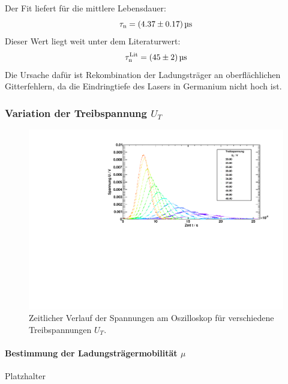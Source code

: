 Der Fit liefert für die mittlere Lebensdauer:
\begin{equation}
  \tau_\text{n} = (4.37 \pm 0.17)\,\text{\textmu s}
\end{equation}
Dieser Wert liegt weit unter dem Literaturwert: 
\begin{equation}
  \tau_\text{n}^\text{Lit} = (45 \pm 2)\,\text{\textmu s}
\end{equation}
Die Ursache dafür ist Rekombination der Ladungsträger an oberflächlichen Gitterfehlern,
da die Eindringtiefe des Lasers in Germanium nicht hoch ist.

\subsubsection{Variation der Treibspannung \texorpdfstring{$U_T$}{U\_T}}

\begin{figure}[H]
\begin{center}
  \includegraphics[width=\textwidth]{../img/part2/voltages.pdf}
  \caption{Zeitlicher Verlauf der Spannungen am Oszilloskop für verschiedene Treibspannungen $U_T$.}
  \label{img:volts}
\end{center}
\end{figure}

\paragraph{Bestimmung der Ladungsträgermobilität $\mu$} 
Platzhalter

